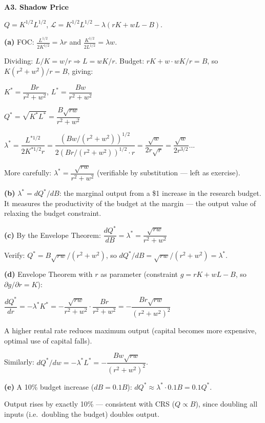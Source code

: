 \documentclass[12pt, a4paper]{article}
\theoremstyle{definition}
\newcommand{\ddd}[2]{\dfrac{d#1}{d#2}}
\newcommand{\Lag}{\mathcal{L}}
\begin{document}
\begin{solbox}
\textbf{A3. Shadow Price}

$Q = K^{1/2}L^{1/2}$, $\Lag=K^{1/2}L^{1/2}-\lambda(rK+wL-B)$.

\textbf{(a)} FOC: $\frac{L^{1/2}}{2K^{1/2}} = \lambda r$ and $\frac{K^{1/2}}{2L^{1/2}}=\lambda w$.

Dividing: $L/K = w/r \Rightarrow L=wK/r$. Budget: $rK+w\cdot wK/r=B$,
so $K(r^2+w^2)/r=B$, giving:

$K^* = \dfrac{Br}{r^2+w^2}$, \quad $L^* = \dfrac{Bw}{r^2+w^2}$

$Q^* = \sqrt{K^*L^*} = \dfrac{B\sqrt{rw}}{r^2+w^2}$

$\lambda^* = \dfrac{L^{*1/2}}{2K^{*1/2}r}
= \dfrac{(Bw/(r^2+w^2))^{1/2}}{2(Br/(r^2+w^2))^{1/2}\cdot r}
= \dfrac{\sqrt{w}}{2r\sqrt{r}} = \dfrac{\sqrt{w}}{2r^{3/2}}$...

More carefully: $\lambda^* = \dfrac{\sqrt{rw}}{r^2+w^2}$ (verifiable by substitution --- left as exercise).

\textbf{(b)} $\lambda^* = dQ^*/dB$: the marginal output from a \$1 increase in the research budget. It measures the productivity of the budget at the margin --- the output value of relaxing the budget constraint.

\textbf{(c)} By the Envelope Theorem:
$\ddd{Q^*}{B} = \lambda^* = \dfrac{\sqrt{rw}}{r^2+w^2}$

Verify: $Q^* = B\sqrt{rw}/(r^2+w^2)$, so $dQ^*/dB = \sqrt{rw}/(r^2+w^2) = \lambda^*$. \checkmark

\textbf{(d)} Envelope Theorem with $r$ as parameter (constraint $g=rK+wL-B$, so $\partial g/\partial r = K$):

$\ddd{Q^*}{r} = -\lambda^* K^* = -\dfrac{\sqrt{rw}}{r^2+w^2}\cdot\dfrac{Br}{r^2+w^2}
= -\dfrac{Br\sqrt{rw}}{(r^2+w^2)^2}$

A higher rental rate reduces maximum output (capital becomes more expensive, optimal use of capital falls).

Similarly: $dQ^*/dw = -\lambda^* L^* = -\dfrac{Bw\sqrt{rw}}{(r^2+w^2)^2}$.

\textbf{(e)} A 10\% budget increase ($dB = 0.1B$): $dQ^* \approx \lambda^*\cdot 0.1B = 0.1Q^*$.

Output rises by exactly 10\% --- consistent with CRS ($Q\propto B$), since doubling all inputs (i.e.\ doubling the budget) doubles output.
\end{solbox}
\end{document}

